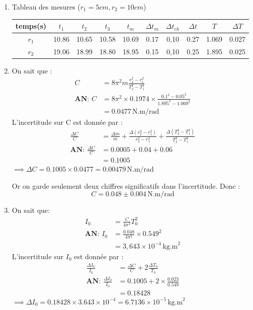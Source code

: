 \documentclass[a4paper,12pt]{article}
\begin{document}
\begin{enumerate}
    \item Tableau des mesures ($r_1 = 5cm, r_2 = 10cm$)
\begin{table}[H]
    \centering
    \renewcommand{\arraystretch}{1.5}
    \begin{tabular}{|c|c|c|c|c|c|c|c|c|c|}
    \hline
    temps(s) & $t_1$ & $t_2$ & $t_3$ & $t_m$ & $\Delta t_m$ & $\Delta t_{ch}$ & $\Delta t$ & $T$ & $\Delta T$ \\
    \hline
    $r_1$ & 10.86 & 10.65 & 10.58 & 10.69 & 0.17 & 0,10 & 0.27 & 1.069 & 0.027 \\
    \hline
    $r_2$ & 19.06 & 18.99 & 18.80 & 18.95 & 0.15 & 0,10 & 0.25 & 1.895 & 0.025 \\
    \hline
    \end{tabular}
\end{table}

    \item On sait que : 
    \begin{align*}
        C &= 8 \pi^2 m \frac{r^2_2 - r^2_1}{T^2_2 - T^2_1} \\
        \textbf{AN:  } C & = 8 \pi^2 \times 0.1974 \times \frac{0.1^2 - 0.05^2}{1.895^2 - 1.069^2} \\
        & = 0.0477 \, \text{N.m/rad}
    \end{align*}
    L'incertitude sur C est donnée par :
    \begin{align*}
        \frac{\Delta C}{C} & = \frac{\Delta m}{m} + \frac{\Delta (r^2_2 - r^2_1)}{r^2_2 - r^2_1} + \frac{\Delta (T^2_2 - T^2_1)}{T^2_2 - T^2_1} \\
        \textbf{AN: } \frac{\Delta C}{C} & = 0.0005 + 0.04 + 0.06 \\
        & = 0.1005
    \end{align*}
    $\implies \Delta C = 0.1005 \times 0.0477 = 0.00479 \, \text{N.m/rad}$  
    
    Or on garde seulement deux chiffres significatifs dans l'incertitude. Donc :
    $$ C = 0.048 \pm 0.004 \, \text{N.m/rad} $$
    
    \item On sait que:
    \begin{align*}
        I_0 & = \frac{C}{4\pi^2} T^2_0 \\
        \textbf{AN: } I_0 & = \frac{0.048}{4\pi^2} \times 0.549^2 \\ 
        & = 3,643 \times 10^{-4} \, \text{kg.m}^2
    \end{align*} 
    L'incertitude sur $I_0$ est donnée par :
    \begin{align*}
        \frac{\Delta I_0}{I_0} & = \frac{\Delta C}{C} + 2 \frac{\Delta T_0}{T_0} \\
        \textbf{AN: } \frac{\Delta I_0}{I_0} & = 0.1005 + 2 \times \frac{0.023}{0.549} \\
        & = 0.18428
    \end{align*}
    $\implies \Delta I_0 = 0.18428 \times 3.643 \times 10^{-4} = 6.7136 \times 10^{-5} \, \text{kg.m}^2$ 


\end{enumerate}
\end{document}
